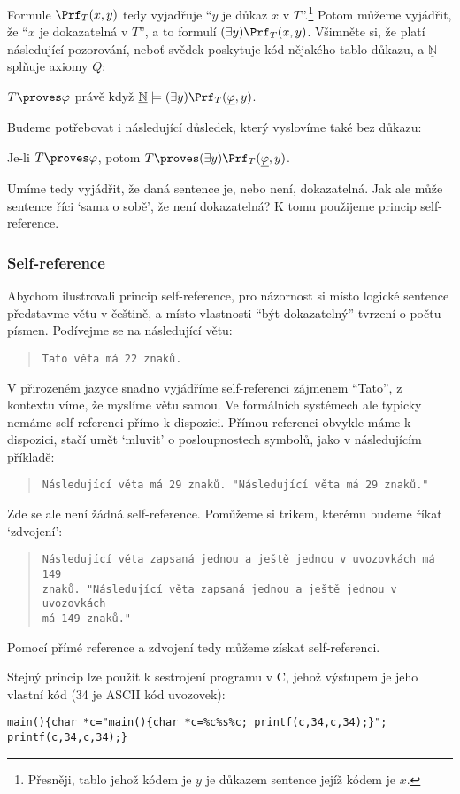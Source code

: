 Formule $\Prf_T(x,y)$ tedy vyjadřuje \alert{``$y$ je důkaz $x$ v $T$''}.\footnote{Přesněji, tablo jehož kódem je $y$ je důkazem sentence jejíž kódem je $x$.} Potom můžeme vyjádřit, že \alert{``$x$ je dokazatelná v $T$''}, a to formulí $(\exists y)\Prf_T(x,y)$. Všimněte si, že platí následující pozorování, neboť svědek poskytuje kód nějakého tablo důkazu, a $\underline{\mathbb N}$ splňuje axiomy $Q$:
\begin{observation}\label{observation:proof-predicate}
$T\proves\varphi$ právě když $\underline{\mathbb N}\models (\exists y)\Prf_T(\underline{\varphi},y)$.  
\end{observation}
Budeme potřebovat i následující důsledek, který vyslovíme také bez důkazu:
\begin{corollary}\label{corollary:predicate-of-provability}
    Je-li $T\proves\varphi$, potom $T\proves (\exists y)\Prf_T(\underline{\varphi},y)$.
\end{corollary}

Umíme tedy vyjádřit, že daná sentence je, nebo není, dokazatelná. Jak ale může sentence říci `sama o sobě', že není dokazatelná? K tomu použijeme \alert{princip self-reference}.

\subsubsection*{Self-reference}

Abychom ilustrovali princip self-reference, pro názornost si místo logické sentence představme větu v češtině, a místo vlastnosti ``být dokazatelný'' tvrzení o počtu písmen. Podívejme se na následující větu:
\begin{quote}
    \texttt{Tato věta má 22 znaků.}
\end{quote}
V přirozeném jazyce snadno vyjádříme self-referenci zájmenem ``Tato'', z kontextu víme, že myslíme větu samou. Ve formálních systémech ale typicky nemáme self-referenci přímo k dispozici. \alert{Přímou referenci} obvykle máme k dispozici, stačí umět `mluvit' o posloupnostech symbolů, jako v následujícím příkladě:
\begin{quote}
    \texttt{Následující věta má 29 znaků. "Následující věta má 29 znaků."}
\end{quote}
Zde se ale není žádná self-reference. Pomůžeme si trikem, kterému budeme říkat `zdvojení':
\begin{quote}
    \texttt{Následující věta zapsaná jednou a ještě jednou v uvozovkách má 149\\ znaků. "Následující věta zapsaná jednou a ještě jednou v uvozovkách\\ má 149 znaků."}
\end{quote}
Pomocí přímé reference a zdvojení tedy můžeme získat self-referenci.\begin{remark}
    Stejný princip lze použít k sestrojení programu v C, jehož výstupem je jeho vlastní kód (34 je ASCII kód uvozovek):    
{\small
\begin{verbatim}
main(){char *c="main(){char *c=%c%s%c; printf(c,34,c,34);}"; printf(c,34,c,34);}    
\end{verbatim}
}
\end{remark}


